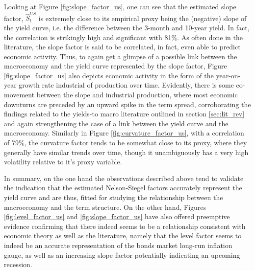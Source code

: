Looking at Figure \ref{fig:slope_factor_us}, one can see that the estimated slope factor, $\hat{S}^{US}_{t}$ is extremely close to its empirical proxy being the (negative) slope of the yield curve, i.e. the difference between the 3-month and 10-year yield. 
In fact, the correlation is strikingly high and significant with 81\%.  
As often done in the literature, the slope factor is said to be correlated, in fact, even able to predict economic activity. 
Thus, to again get a glimpse of a possible link between the macroeconomy and the yield curve represented by the slope factor, Figure \ref{fig:slope_factor_us} also depicts economic activity in the form of the year-on-year growth rate industrial of production over time. 
Evidently, there is some co-movement between the slope and industrial production, where most economic downturns are preceded by an upward spike in the term spread, corroborating the findings related to the yields-to macro literature outlined in section \ref{sec:lit_rev} and again strengthening the case of a link between the yield curve and the macroeconomy. 
Similarly in Figure \ref{fig:curvature_factor_us}, with a correlation of 79\%, the curvature factor tends to be somewhat close to its proxy, where they generally have similar trends over time, though it unambiguously has a very high volatility relative to it's proxy variable. 

In summary, on the one hand the observations described above tend to validate the indication that the estimated Nelson-Siegel factors accurately represent the yield curve and are thus, fitted for studying the relationship between the macroeconomy and the term structure. On the other hand, Figures \ref{fig:level_factor_us} and \ref{fig:slope_factor_us} have also offered preemptive evidence confirming that there indeed seems to be a relationship consistent with economic theory as well as the literature, namely that the level factor seems to indeed be an accurate representation of the bonds market long-run inflation gauge, as well as an increasing slope factor potentially indicating an upcoming recession.

